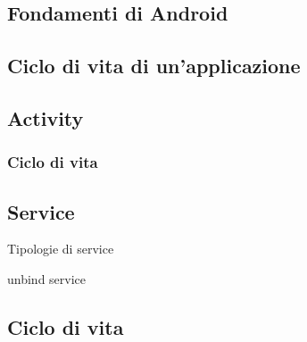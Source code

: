 \documentclass[../ManualeSviluppatore.tex]{subfiles}
\begin{document}
\begin{appendices}
	\section{Fondamenti di Android}
	
		\subsection{Ciclo di vita di un'applicazione}
		
		\subsection{Activity}
		
			\subsubsection{Ciclo di vita}
			
		\subsection{Service}
		
			Tipologie di service
			\begin{description}
				\item unbind service
			\end{description}
		
			\subsection{Ciclo di vita}
			
			

\end{appendices}
\end{document}

